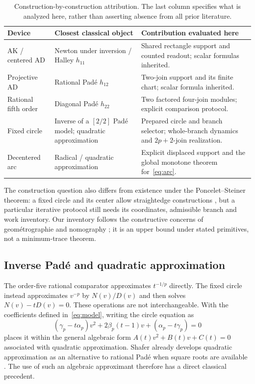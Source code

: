\documentclass[11pt,a4paper]{article}
\begin{document}
\begin{table}[H]\centering\small
\caption{Construction-by-construction attribution. The last column specifies what is analyzed here, rather than asserting absence from all prior literature.}
\begin{tabularx}{\linewidth}{@{}p{.20\linewidth}p{.32\linewidth}X@{}}\toprule
Device & Closest classical object & Contribution evaluated here\\\midrule
AK / centered AD & Newton under inversion / Halley $h_{11}$ & Shared rectangle support and counted readout; scalar formulas inherited.\\
Projective AD & Rational Pad\'e $h_{12}$ & Two-join support and its finite chart; scalar formula inherited.\\
Rational fifth order & Diagonal Pad\'e $h_{22}$ & Two factored four-join modules; explicit comparison protocol.\\
Fixed circle & Inverse of a $[2/2]$ Pad\'e model; quadratic approximation & Prepared circle and branch selector; whole-branch dynamics and $2p+2$-join realization.\\
Decentered arc & Radical / quadratic approximation & Explicit displaced support and the global monotone theorem for~\eqref{eq:arc}.\\\bottomrule
\end{tabularx}\end{table}
The construction question also differs from existence under the Poncelet--Steiner theorem: a fixed circle and its center allow straightedge constructions \cite{steiner1833}, but a particular iterative protocol still needs its coordinates, admissible branch and work inventory. Our inventory follows the constructive concerns of geom\'etrographie and nomography \cite{lemoine1902,docagne1925}; it is an upper bound under stated primitives, not a minimum-trace theorem.

\clearpage
\subsection{Inverse Pad\'e and quadratic approximation}\label{sec:quadraticprior}
The order-five rational comparator approximates $t^{-1/p}$ directly. The fixed circle instead approximates $v^{-p}$ by $N(v)/D(v)$ and then solves $N(v)-tD(v)=0$. These operations are not interchangeable. With the coefficients defined in~\eqref{eq:model}, writing the circle equation as
\[
 (\gamma_p-t\alpha_p)v^2+2\beta_p(t-1)v+(\alpha_p-t\gamma_p)=0
\]
places it within the general algebraic form $A(t)v^2+B(t)v+C(t)=0$ associated with quadratic approximation. Shafer already develops quadratic approximation as an alternative to rational Pad\'e when square roots are available \cite{shafer1974}. The use of such an algebraic approximant therefore has a direct classical precedent.
\end{document}
